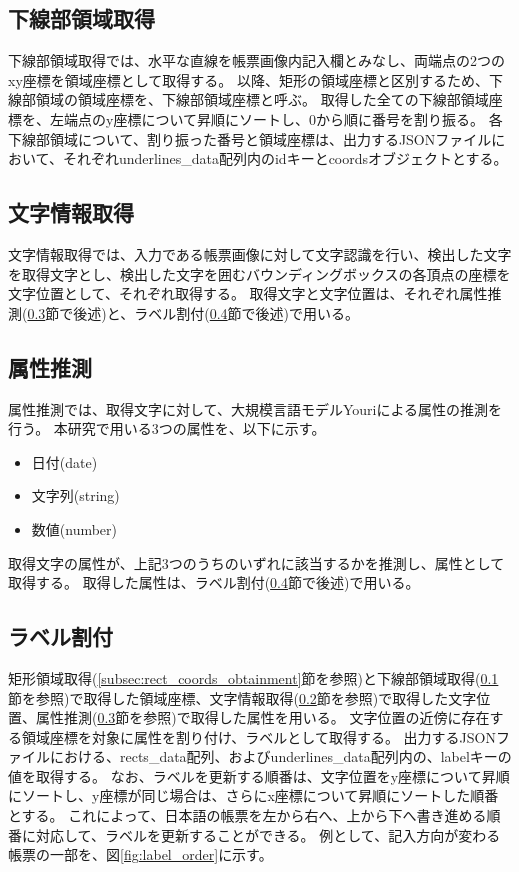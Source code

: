 \subsection{下線部領域取得}\label{subsec:underline_coords_obtainment}
下線部領域取得では、水平な直線を帳票画像内記入欄とみなし、両端点の2つのxy座標を領域座標として取得する。
以降、矩形の領域座標と区別するため、下線部領域の領域座標を、下線部領域座標と呼ぶ。
取得した全ての下線部領域座標を、左端点のy座標について昇順にソートし、0から順に番号を割り振る。
各下線部領域について、割り振った番号と領域座標は、出力するJSONファイルにおいて、それぞれunderlines\_data配列内のidキーとcoordsオブジェクトとする。

\subsection{文字情報取得}\label{subsec:char_information_obtainment}
文字情報取得では、入力である帳票画像に対して文字認識を行い、検出した文字を取得文字とし、検出した文字を囲むバウンディングボックスの各頂点の座標を文字位置として、それぞれ取得する。
取得文字と文字位置は、それぞれ属性推測(\ref{subsec:att_prediction}節で後述)と、ラベル割付(\ref{subsec:label_link}節で後述)で用いる。

\subsection{属性推測}\label{subsec:att_prediction}
属性推測では、取得文字に対して、大規模言語モデルYouriによる属性の推測を行う。
本研究で用いる3つの属性を、以下に示す。

\begin{itemize}
    \item 日付(date)
    \item 文字列(string)
    \item 数値(number)
\end{itemize}

取得文字の属性が、上記3つのうちのいずれに該当するかを推測し、属性として取得する。
取得した属性は、ラベル割付(\ref{subsec:label_link}節で後述)で用いる。

\subsection{ラベル割付}\label{subsec:label_link}
矩形領域取得(\ref{subsec:rect_coords_obtainment}節を参照)と下線部領域取得(\ref{subsec:underline_coords_obtainment}節を参照)で取得した領域座標、文字情報取得(\ref{subsec:char_information_obtainment}節を参照)で取得した文字位置、属性推測(\ref{subsec:att_prediction}節を参照)で取得した属性を用いる。
文字位置の近傍に存在する領域座標を対象に属性を割り付け、ラベルとして取得する。
出力するJSONファイルにおける、rects\_data配列、およびunderlines\_data配列内の、labelキーの値を取得する。
なお、ラベルを更新する順番は、文字位置をy座標について昇順にソートし、y座標が同じ場合は、さらにx座標について昇順にソートした順番とする。
これによって、日本語の帳票を左から右へ、上から下へ書き進める順番に対応して、ラベルを更新することができる。
例として、記入方向が変わる帳票の一部を、図\ref{fig:label_order}に示す。

